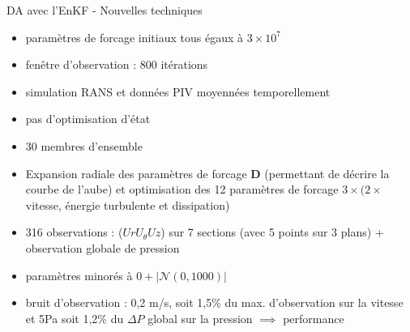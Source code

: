 \documentclass[10pt, aspectratio=169, dvipsnames]{beamer}
\begin{document}



\begin{frame}{DA avec l'EnKF - Nouvelles techniques}

    \begin{itemize}
        \item paramètres de forcage initiaux tous égaux à $3 \times 10^7$
        \item fenêtre d'observation : 800 itérations
        \item simulation RANS et données PIV moyennées temporellement
        \item pas d'optimisation d'état
        \item 30 membres d'ensemble
    \end{itemize}


    \begin{itemize}
        \item Expansion radiale des paramètres de forcage $\boldsymbol{D}$ (permettant de décrire la courbe de l'aube) et optimisation des 12 paramètres de forcage $3\times (2\times$ vitesse, énergie turbulente et dissipation)
        \item 316 observations : ($Ur U_{\theta} Uz$) sur 7 sections (avec 5 points sur 3 plans) + observation globale de pression
        \item paramètres minorés à $0 + \left| \mathcal{N}(0, 1000) \right|$
        \item bruit d'observation : 0,2 m/s, soit 1,5\% du max. d'observation sur la vitesse et 5Pa soit 1,2\% du $\Delta P$ global sur la pression $\implies$ performance
    \end{itemize}

\end{frame}
\end{document}
